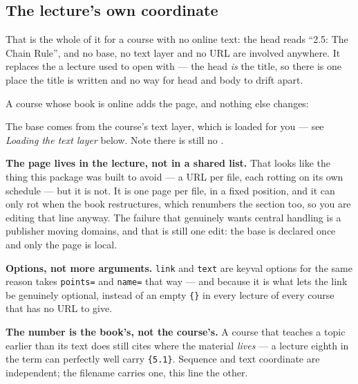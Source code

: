 \subsection*{The lecture's own coordinate}


That is the whole of it for a course with no online text: the head reads
``2.5: The Chain Rule'', and no base, no text layer and no URL are
involved anywhere. It replaces the  a lecture used to open
with --- the head \emph{is} the title, so there is one place the title is
written and no way for head and body to drift apart.

A course whose book is online adds the page, and nothing else changes:


The base comes from the course's text layer, which is loaded for you --- see
\emph{Loading the text layer} below. Note there is still no .

\textbf{The page lives in the lecture, not in a shared list.} That looks
like the thing this package was built to avoid --- a URL per file, each
rotting on its own schedule --- but it is not. It is one page per file,
in a fixed position, and it can only rot when the book restructures,
which renumbers the section too, so you are editing that line anyway. The
failure that genuinely wants central handling is a publisher moving
domains, and that is still one edit: the base is declared once and only
the page is local.

\textbf{Options, not more arguments.} \texttt{link} and \texttt{text} are
keyval options for the same reason  takes
\texttt{points=} and \texttt{name=} that way --- and because it is what
lets the link be genuinely optional, instead of an empty \texttt{\{\}} in
every lecture of every course that has no URL to give.

\textbf{The number is the book's, not the course's.} A course that
teaches a topic earlier than its text does still cites where the material
\emph{lives} --- a lecture eighth in the term can perfectly well carry
\texttt{\{5.1\}}. Sequence and text coordinate are
independent; the filename carries one, this line the other.

